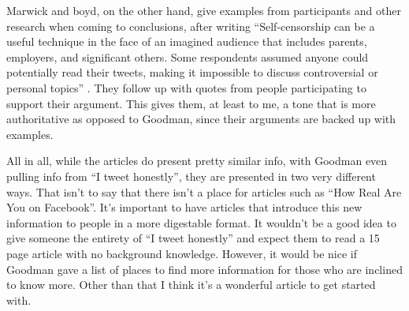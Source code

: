 \documentclass[12pt]{article}
\begin{document}
\begin{doublespace}
        Marwick and boyd, on the other hand, give examples from participants and other research when coming to conclusions, after writing
        ``Self-censorship can be a useful technique in the face of an imagined audience that includes parents, employers, and significant others. Some respondents assumed anyone could potentially read their tweets, making it impossible to discuss controversial or personal topics'' \autocite*[125]{tweet}.
        They follow up with quotes from people participating to support their argument. This gives them, at least to me, a tone that is more authoritative as opposed to Goodman, since their arguments are backed up with examples.
    \par%
        All in all, while the articles do present pretty similar info, with Goodman even pulling info from ``I tweet honestly'', they are presented in two very different ways. That isn't to say that there isn't a place for articles such as ``How Real Are You on Facebook''.
        It's important to have articles that introduce this new information to people in a more digestable format. It wouldn't be a good idea to give someone the entirety of ``I tweet honestly'' and expect them to read a 15 page article with no background knowledge.
        However, it would be nice if Goodman gave a list of places to find more information for those who are inclined to know more. Other than that I think it's a wonderful article to get started with.
    \newpage \printbibliography
    \end{doublespace}
\end{document}
